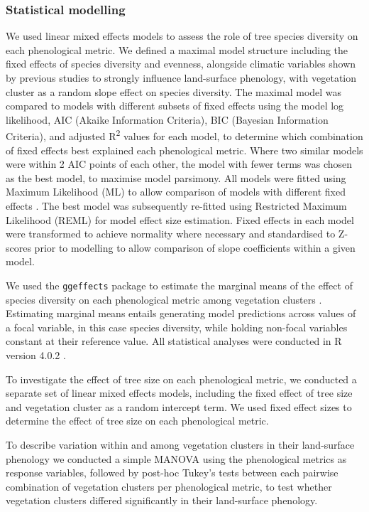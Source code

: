 \documentclass[11pt,a4paper]{article}
\begin{document}
\subsubsection{Statistical modelling}

We used linear mixed effects models to assess the role of tree species diversity on each phenological metric. We defined a maximal model structure including the fixed effects of species diversity and evenness, alongside climatic variables shown by previous studies to strongly influence land-surface phenology, with vegetation cluster as a random slope effect on species diversity. The maximal model was compared to models with different subsets of fixed effects using the model log likelihood, AIC (Akaike Information Criteria), BIC (Bayesian Information Criteria), and adjusted R\textsuperscript{2} values for each model, to determine which combination of fixed effects best explained each phenological metric. Where two similar models were within 2 AIC points of each other, the model with fewer terms was chosen as the best model, to maximise model parsimony. All models were fitted using Maximum Likelihood (ML) to allow comparison of models with different fixed effects \citep{Zuur2009}. The best model was subsequently re-fitted using Restricted Maximum Likelihood (REML) for model effect size estimation. Fixed effects in each model were transformed to achieve normality where necessary and standardised to Z-scores prior to modelling to allow comparison of slope coefficients within a given model.

We used the \texttt{ggeffects} package to estimate the marginal means of the effect of species diversity on each phenological metric among vegetation clusters \citep{ggeffects}. Estimating marginal means entails generating model predictions across values of a focal variable, in this case species diversity, while holding non-focal variables constant at their reference value. All statistical analyses were conducted in R version 4.0.2 \citep{R2020}.

To investigate the effect of tree size on each phenological metric, we conducted a separate set of linear mixed effects models, including the fixed effect of tree size and vegetation cluster as a random intercept term. We used fixed effect sizes to determine the effect of tree size on each phenological metric.

To describe variation within and among vegetation clusters in their land-surface phenology we conducted a simple MANOVA using the phenological metrics as response variables, followed by post-hoc Tukey's tests between each pairwise combination of vegetation clusters per phenological metric, to test whether vegetation clusters differed significantly in their land-surface phenology.
\end{document}
